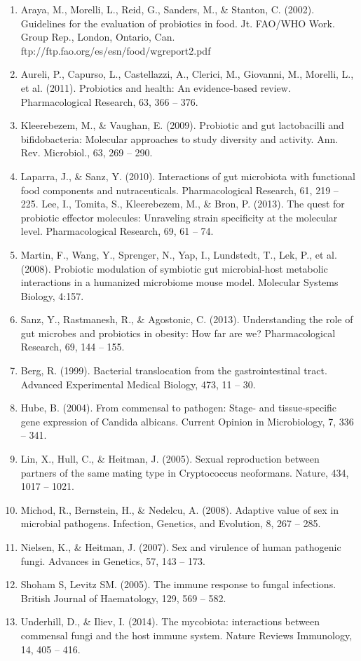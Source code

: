 \documentclass[11pt,letterpaper,final] {article}
\begin{document}
\begin{enumerate}
\item Araya, M., Morelli, L., Reid, G., Sanders, M., \& Stanton, C. (2002). Guidelines for the evaluation of probiotics in food. Jt. FAO/WHO Work. Group Rep., London, Ontario, Can. ftp://ftp.fao.org/es/esn/food/wgreport2.pdf
\item Aureli, P., Capurso, L., Castellazzi, A., Clerici, M., Giovanni, M., Morelli, L., et al. (2011). Probiotics and health: An evidence-based review. Pharmacological Research, 63, 366 -- 376.
\item Kleerebezem, M., \& Vaughan, E. (2009). Probiotic and gut lactobacilli and bifidobacteria: Molecular approaches to study diversity and activity. Ann. Rev. Microbiol., 63, 269 -- 290.
\item Laparra, J., \& Sanz, Y. (2010). Interactions of gut microbiota with functional food components and nutraceuticals. Pharmacological Research, 61, 219 -- 225.
Lee, I., Tomita, S., Kleerebezem, M., \& Bron, P. (2013). The quest for probiotic effector molecules: Unraveling strain specificity at the molecular level. Pharmacological Research, 69, 61 -- 74.
\item Martin, F., Wang, Y., Sprenger, N., Yap, I., Lundstedt, T., Lek, P., et al. (2008). Probiotic modulation of symbiotic gut microbial-host metabolic interactions in a humanized microbiome mouse model. Molecular Systems Biology, 4:157.
\item Sanz, Y., Rastmanesh, R., \& Agostonic, C. (2013). Understanding the role of gut microbes and probiotics in obesity: How far are we? Pharmacological Research, 69, 144 -- 155.

\item Berg, R. (1999). Bacterial translocation from the gastrointestinal tract. Advanced Experimental Medical Biology, 473, 11 -- 30.
\item Hube, B. (2004). From commensal to pathogen: Stage- and tissue-specific gene expression of Candida albicans. Current Opinion in Microbiology, 7, 336 -- 341.
\item Lin, X., Hull, C., \& Heitman, J. (2005). Sexual reproduction between partners of the same mating type in Cryptococcus neoformans. Nature, 434, 1017 -- 1021.
\item Michod, R., Bernstein, H., \& Nedelcu, A. (2008). Adaptive value of sex in microbial pathogens. Infection, Genetics, and Evolution, 8, 267 -- 285.
\item Nielsen, K., \& Heitman, J. (2007). Sex and virulence of human pathogenic fungi. Advances in Genetics, 57, 143 -- 173.
\item Shoham S, Levitz SM. (2005). The immune response to fungal infections. British Journal of Haematology, 129, 569 -- 582.
\item Underhill, D., \& Iliev, I. (2014). The mycobiota: interactions between commensal fungi and the host immune system. Nature Reviews Immunology, 14, 405 -- 416.


\end{enumerate}
\end{document}
